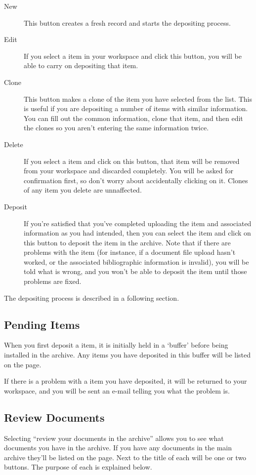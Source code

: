 \begin{description}
\item[New] This button creates a fresh record and starts the depositing process.
\item[Edit] If you select a item in your workspace and click this button, you will be able to carry on depositing that item.
\item[Clone] This button makes a clone of the item you have selected from the list. This is useful if you are depositing a number of items with similar information. You can fill out the common information, clone that item, and then edit the clones so you aren't entering the same information twice.
\item[Delete] If you select a item and click on this button, that item will be removed from your workspace and discarded completely. You will be asked for confirmation first, so don't worry about accidentally clicking on it. Clones of any item you delete are unnaffected.
\item[Deposit] If you're satisfied that you've completed uploading the item and associated information as you had intended, then you can select the item and click on this button to deposit the item in the archive. Note that if there are problems with the item (for instance, if a document file upload hasn't worked, or the associated bibliographic information is invalid), you will be told what is wrong, and you won't be able to deposit the item until those problems are fixed.
\end{description}

The depositing process is described in a following section.


\subsection{Pending Items}

When you first deposit a item, it is initially held in a `buffer' before being installed in the archive. Any items you have deposited in this buffer will be listed on the page.

If there is a problem with a item you have deposited, it will be returned to your workspace, and you will be sent an e-mail telling you what the problem is.


\subsection{Review Documents}

Selecting ``review your documents in the archive'' allows you to see what documents you have in the archive. If you have any documents in the main archive they'll be listed on the page. Next to the title of each will be one or two buttons. The purpose of each is explained below.

